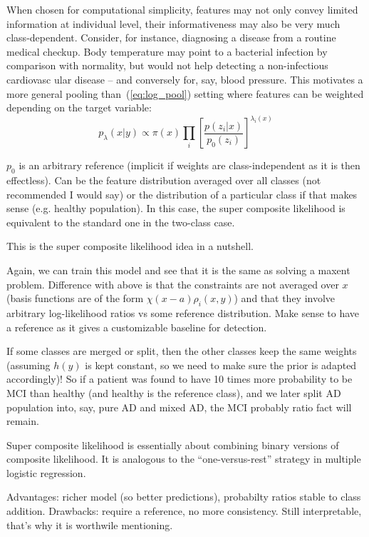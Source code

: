 \documentclass[english]{scrartcl}
\begin{document}
When chosen for computational simplicity, features may not only convey limited information at individual level, their informativeness may also be very much class-dependent. Consider, for instance, diagnosing a disease from a routine medical checkup. Body temperature may point to a bacterial infection by comparison with normality, but would not help detecting a non-infectious cardiovasc ular disease -- and conversely for, say, blood pressure. This motivates a more general pooling than~(\ref{eq:log_pool}) setting where features can be weighted depending on the target variable:
$$
p_\lambda(x|y) \propto \pi(x) \prod_i \left[\frac{p(z_i|x)}{p_0(z_i)}\right]^{\lambda_i(x)}
$$

$p_0$ is an arbitrary reference (implicit if weights are class-independent as it is then effectless). Can be the feature distribution averaged over all classes (not recommended I would say) or the distribution of a particular class if that makes sense (e.g. healthy population). In this case, the super composite likelihood is equivalent to the standard one in the two-class case.

This is the super composite likelihood idea in a nutshell.

Again, we can train this model and see that it is the same as solving a maxent problem. Difference with above is that the constraints are not averaged over $x$ (basis functions are of the form $\chi(x-a)\rho_i(x,y)$) and that they involve arbitrary log-likelihood ratios vs some reference distribution. Make sense to have a reference as it gives a customizable baseline for detection.

If some classes are merged or split, then the other classes keep the same weights (assuming $h(y)$ is kept constant, so we need to make sure the prior is adapted accordingly)! So if a patient was found to have 10 times more probability to be MCI than healthy (and healthy is the reference class), and we later split AD population into, say, pure AD and mixed AD, the MCI probably ratio fact will remain.

Super composite likelihood is essentially about combining binary versions of composite likelihood. It is analogous to the ``one-versus-rest'' strategy in multiple logistic regression. 


Advantages: richer model (so better predictions), probabilty ratios stable to class addition. Drawbacks: require a reference, no more consistency. Still interpretable, that's why it is worthwile mentioning.
\end{document}
